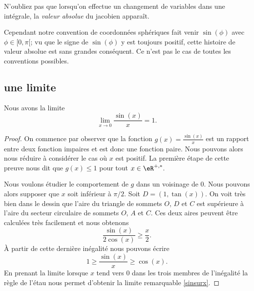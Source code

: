 N'oubliez pas que lorsqu'on effectue un changement de variables dans une intégrale, la \emph{valeur absolue} du jacobien apparaît.

Cependant notre convention de coordonnées sphériques fait venir \( \sin(\phi)\) avec \( \phi\in\mathopen[ 0 , \pi [\); vu que le signe de \( \sin(\phi)\) y est toujours positif, cette histoire de valeur absolue est sans grandes conséquent. Ce n'est pas le cas de toutes les conventions possibles.


\subsection{une limite}

\begin{proposition}
    Nous avons la limite
    \begin{equation}\label{sinsurx}
      \lim_{x\to 0} \frac{\sin(x)}{x} = 1.
    \end{equation}
\end{proposition}

\begin{proof}
    On commence par observer que la fonction $g(x)=\frac{\sin(x)}{x}$ est un rapport entre deux fonction impaires et est donc une fonction paire. Nous pouvons alors nous réduire à considérer le cas où $x$ est positif. La première étape de cette preuve nous dit que $g(x)\leq 1$ pour tout $x\in\eR^{+,*}$. 

    Nous voulons étudier le comportement de $g$ dans un voisinage de $0$. Nous pouvons alors supposer que $x$ soit inférieur à $\pi/2$. Soit $D = (1, \tan (x))$. On voit très bien dans le dessin que l'aire du triangle de sommets $O$, $D$ et $C$ est supérieure à l'aire du secteur circulaire de sommets $O$, $A$ et $C$. Ces deux aires peuvent \^etre calculées très facilement et nous obtenons
    \begin{equation*}
      \frac{\sin(x)}{2\cos(x)} \geq \frac{x}{2}.
    \end{equation*}
    À partir de cette dernière inégalité nous pouvons écrire 
    \begin{equation*}
      1\geq \frac{\sin(x)}{x}\geq \cos(x).
    \end{equation*}
    En prenant la limite lorsque $x$ tend vers $0$ dans les trois membres de l'inégalité la règle de l'étau nous permet d'obtenir la limite remarquable  \eqref{sinsurx}. 
\end{proof}


